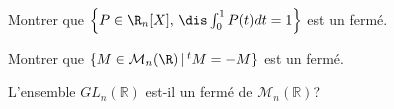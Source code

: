 \documentclass[a4paper,10pt]{report}
\begin{document}

\begin{Exercice}{} Montrer que $\left\{P\in\R_n[X], \, \dis\int_0^1P(t)dt= 1\right\}$ est un fermé.
\end{Exercice}


\begin{Exercice}{} Montrer que $\{M\in{\cal M}_n(\R) \, \vert \,  ^tM=-M\}$ est un fermé.
\end{Exercice}


\begin{Exercice}{} L'ensemble $GL_n(\mathbb{R})$ est-il un fermé de $\mathcal{M}_n(\mathbb{R})$?
\end{Exercice} 

\end{document}

